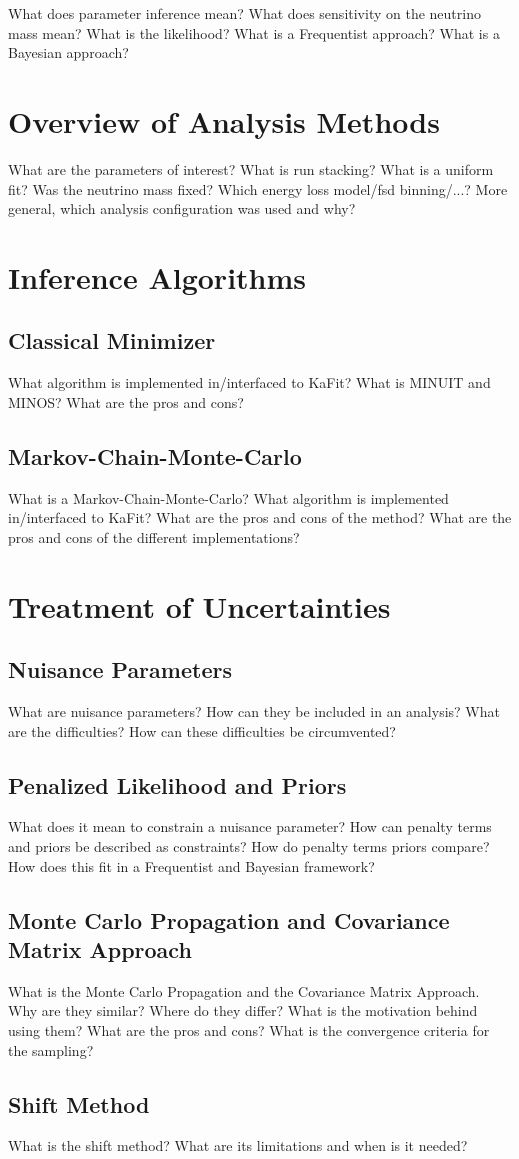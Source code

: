 


What does parameter inference mean? What does sensitivity on the neutrino mass mean? What is the likelihood? What is a Frequentist approach? What is a Bayesian approach? 
\section{Overview of Analysis Methods}
What are the parameters of interest? What is run stacking? What is a uniform fit? Was the neutrino mass fixed? Which energy loss model/fsd binning/...? More general, which analysis configuration was used and why?

\section{Inference Algorithms}
\subsection{Classical Minimizer}
What algorithm is implemented in/interfaced to KaFit? What is MINUIT and MINOS? What are the pros and cons?
\subsection{Markov-Chain-Monte-Carlo}
What is a Markov-Chain-Monte-Carlo?  What algorithm is implemented in/interfaced to KaFit? What are the pros and cons of the method? What are the pros and cons of the different implementations?

\section{Treatment of Uncertainties}
\subsection{Nuisance Parameters}
What are nuisance parameters? How can they be included in an analysis? What are the difficulties? How can these difficulties be circumvented?
\subsection{Penalized Likelihood and Priors}
What does it mean to constrain a nuisance parameter? How can penalty terms and priors be described as constraints? How do penalty terms priors compare? How does this fit in a Frequentist and Bayesian framework?
\subsection{Monte Carlo Propagation and Covariance Matrix Approach}
What is the Monte Carlo Propagation and the Covariance Matrix Approach. Why are they similar? Where do they differ? What is the motivation behind using them? What are the pros and cons? What is the convergence criteria for the sampling?
\subsection{Shift Method}
What is the shift method? What are its limitations and when is it needed?
